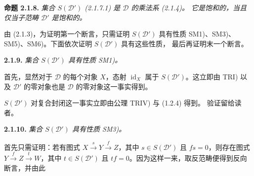 \medskip
\noindent\textbf{命题 2.1.8.}\quad
{}
\emph{集合 $S(\mathcal D')$ (2.1.7.1) 是 $\mathcal D$ 的乘法系 (2.1.4)。
它是饱和的，当且仅当子范畴 $\mathcal D'$ 是饱和的。}

由 (2.1.3)，为证明第一个断言，只需证明 $S(\mathcal D')$ 具有性质
SM1)、SM3)、SM5)、SM6)。下面依次证明 $S(\mathcal D')$ 具有这些性质，
最后再证明末一个断言。

\medskip
\noindent\textbf{2.1.9.}\quad
{}
\emph{集合 $S(\mathcal D')$ 具有性质 SM1)。}

首先，显然对于 $\mathcal D$ 的每个对象 $X$，态射
$\operatorname{id}_X$ 属于 $S(\mathcal D')$。这立即由 TRI) 以及
$\mathcal D'$ 的零对象也是 $\mathcal D$ 的零对象这一事实得到。

$S(\mathcal D')$ 对复合封闭这一事实立即由公理 TRIV) 与 (1.2.4) 得到。
验证留给读者。

\medskip
\noindent\textbf{2.1.10.}\quad
{}
\emph{集合 $S(\mathcal D')$ 具有性质 SM3)。}

首先只需证明：若有图式 $X\xrightarrow{s}Y\xrightarrow{f}Z$，其中
$s\in S(\mathcal D')$ 且 $fs=0$，则存在图式
$Y\xrightarrow{f}Z\xrightarrow{t}W$，其中 $t\in S(\mathcal D')$ 且
$tf=0$。因为这样一来，取反范畴便得到反向断言，并由此

\endgroup
